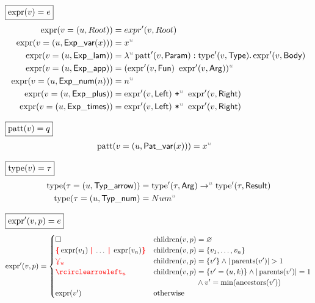 \noindent $\boxed{\operatorname{\text{expr}}(v) = e}$
%
\begin{align*}
  \expr(v=(u, Root)) &= expr'(v, Root) \\
  \expr(v=(u, \ExpVar(x))) &= x^{\id{u}} \\
  \expr(v=(u, \ExpLam)) &= \lambda^{\id{u}} \patt'(v, \LamParam) : \type'(v, \LamType) . \expr'(v, \LamBody) \\
  \expr(v=(u, \ExpApp)) &= (\expr'(v, \AppFun)~\expr'(v, \AppArg))^{\id{u}} \\
  \expr(v=(u, \ExpNum(n))) &= n^{\id{u}} \\
  \expr(v=(u, \ExpPlus)) &= \expr'(v, \PlusLeft)~\texttt{+}^{\id{u}}~\expr'(v, \PlusRight) \\
  \expr(v=(u, \ExpTimes)) &= \expr'(v, \TimesLeft)~\texttt{*}^{\id{u}}~\expr'(v, \TimesRight)
\end{align*}

\noindent $\boxed{\operatorname{\text{patt}}(v) = q}$
%
\begin{align*}
  \patt(v=(u, \PatVar(x))) &= x^{\id{u}}
\end{align*}

\noindent $\boxed{\operatorname{\text{type}}(v) = \tau}$
%
\begin{align*}
  \type(\tau=(u, \TypArrow)) &= \type'(\tau, \ArrowArg) \rightarrow^{\id{u}} \type'(\tau, \ArrowResult) \\
  \type(\tau=(u, \TypNum) &= Num^{\id{u}}
\end{align*}

\noindent $\boxed{\operatorname{\text{expr}}'(v, p) = e}$
%
\begin{align*}
  \expr'(v,p) = \begin{cases}
    \hole & \children(v,p) = \varnothing \\
    \conflictHole{\expr(v_1),\ldots,\expr(v_n)} & \children(v,p) = \SetOf{v_1, \ldots, v_n} \\
    \multiVertex{u} & \children(v,p) = \SetOf{v'} \land |\parents(v')| > 1 \\
    \cycleVertex{u} & \children(v,p) = \SetOf{v' = (u,k)} \land |\parents(v')| = 1 \\
        & \phantom{\children(v,p)} \land v' = \min(\ancestors(v')) \\
    \expr(v') & \text{otherwise} \\
  \end{cases}
\end{align*}

